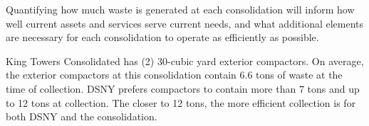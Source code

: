 
    Quantifying how much waste is generated at each consolidation will inform how well current assets and services serve current needs, and what additional elements are necessary for each consolidation to operate as efficiently as possible.
    
    King Towers Consolidated has (2) 30-cubic yard exterior compactors. On average, the exterior compactors at this consolidation contain 6.6 tons of waste at the time of collection. DSNY prefers compactors to contain more than 7 tons and up to 12 tons at collection. The closer to 12 tons, the more efficient collection is for both DSNY and the consolidation.